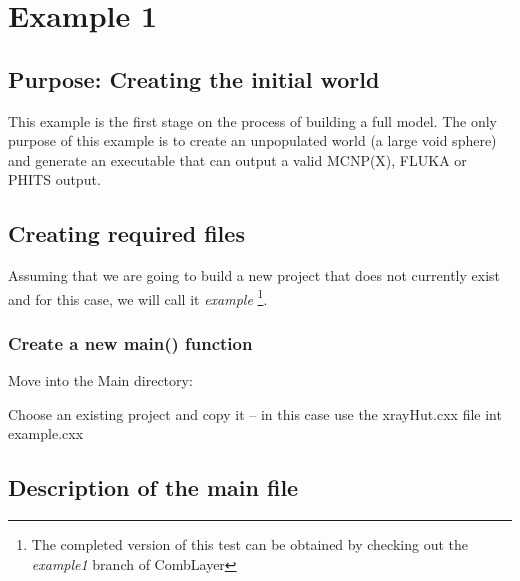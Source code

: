 
\section{Example 1}

\subsection{Purpose: Creating the initial world}

This example is the first stage on the process of building a full model.
The only purpose of this example is to create an unpopulated world (a large
void sphere) and generate an executable that can output a valid MCNP(X),
FLUKA or PHITS output.

\subsection{Creating required files}

Assuming that we are going to build a new project that does not
currently exist and for this case, we will call it {\it example}
\footnote{The completed version of this test can be obtained by
checking out the {\it example1} branch of CombLayer}.

\subsubsection{Create a new main() function}

Move into the Main directory:

Choose an existing project and copy it  --  in this case
use the xrayHut.cxx file int example.cxx

\subsection{Description of the main file}


